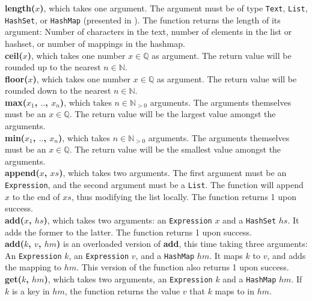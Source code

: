 \textbf{length($x$)}, which takes one argument. The argument must be of type \texttt{Text}, \texttt{List}, \texttt{HashSet}, or \texttt{HashMap} (presented in ). The function returns the length of its argument: Number of characters in the text, number of elements in the list or hashset, or number of mappings in the hashmap. \\

\textbf{ceil($x$)}, which takes one number $x \in \mathbb{Q}$ as argument. The return value will be rounded up to the nearest $n \in \mathbb{N}$. \\

\textbf{floor($x$)}, which takes one number $x \in \mathbb{Q}$ as argument. The return value will be rounded down to the nearest $n \in \mathbb{N}$. \\

\textbf{max($x_{1}$, $..$, $x_{n}$)}, which takes $n \in \mathbb{N}_{>0}$ arguments. The arguments themselves must be an $x \in \mathbb{Q}$. The return value will be the largest value amongst the arguments. \\

\textbf{min($x_{1}$, $..$, $x_{n}$)}, which takes $n \in \mathbb{N}_{>0}$ arguments. The arguments themselves must be an $x \in \mathbb{Q}$. The return value will be the smallest value amongst the arguments. \\

\textbf{append($x$, $xs$)}, which takes two arguments. The first argument must be an \texttt{Expression}, and the second argument must be a \texttt{List}. The function will append $x$ to the end of $xs$, thus modifying the list locally. The function returns 1 upon success. \\

\textbf{add($x$, $hs$)}, which takes two arguments: an \texttt{Expression} $x$ and a \texttt{HashSet} $hs$. It adds the former to the latter. The function returns 1 upon success. \\

\textbf{add($k$, $v$, $hm$)} is an overloaded version of \textbf{add}, this time taking three arguments: An \texttt{Expression} $k$, an \texttt{Expression} $v$, and a \texttt{HashMap} $hm$. It maps $k$ to $v$, and adds the mapping to $hm$. This version of the function also returns 1 upon success. \\

\textbf{get($k$, $hm$)}, which takes two arguments, an \texttt{Expression} $k$ and a \texttt{HashMap} $hm$. If $k$ is a key in $hm$, the function returns the value $v$ that $k$ maps to in $hm$. \\

